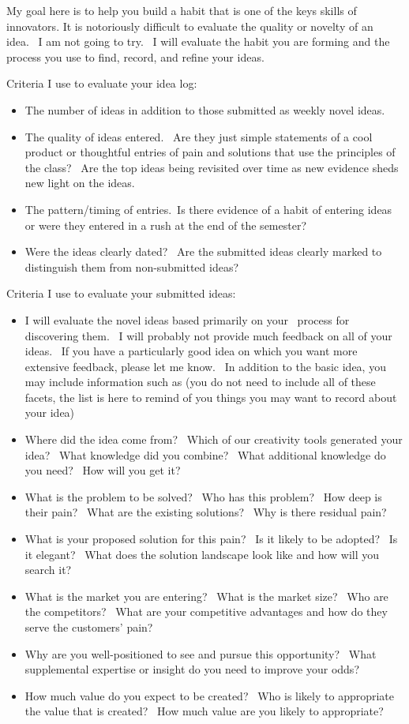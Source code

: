 \documentclass[11pt,article,oneside]{memoir}
\begin{document}
My goal here is to help you build a habit that is one of the keys skills
of innovators. It is notoriously difficult to evaluate the quality or
novelty of an idea.~ I am not going to try.~ I will evaluate the habit
you are forming and the process you use to find, record, and refine your
ideas.

Criteria I use to evaluate your idea log:

\begin{itemize}
\tightlist
\item
  The number of ideas in addition to those submitted as weekly novel
  ideas.
\item
  The quality of ideas entered.~ Are they just simple statements of a
  cool product or thoughtful entries of pain and solutions that use the
  principles of the class?~ Are the top ideas being revisited over time
  as new evidence sheds new light on the ideas.
\item
  The pattern/timing of entries.~Is there evidence of a habit of
  entering ideas or were they entered in a rush at the end of the
  semester?
\item
  Were the ideas clearly dated?~ Are the submitted ideas clearly marked
  to distinguish them from non-submitted ideas?
\end{itemize}

Criteria I use to evaluate your submitted ideas:

\begin{itemize}
\tightlist
\item
  I will evaluate the novel ideas based primarily on your~ process for
  discovering them.~ I will probably not provide much feedback on all of
  your ideas.~ If you have a particularly good idea on which you want
  more extensive feedback, please let me know.~ In addition to the basic
  idea, you may include information such as (you do not need to include
  all of these facets, the list is here to remind of you things you may
  want to record about your idea)
\item
  Where did the idea come from?~ Which of our creativity tools generated
  your idea?~ What knowledge did you combine?~ What additional knowledge
  do you need?~ How will you get it?
\item
  What is the problem to be solved?~ Who has this problem?~ How deep is
  their pain?~ What are the existing solutions?~ Why is there residual
  pain?
\item
  What is your proposed solution for this pain?~ Is it likely to be
  adopted?~ Is it elegant?~ What does the solution landscape look like
  and how will you search it?
\item
  What is the market you are entering?~ What is the market size?~ Who
  are the competitors?~ What are your competitive advantages and how do
  they serve the customers' pain?
\item
  Why are you well-positioned to see and pursue this opportunity?~ What
  supplemental expertise or insight do you need to improve your odds?
\item
  How much value do you expect to be created?~ Who is likely to
  appropriate the value that is created?~ How much value are you likely
  to appropriate?
\end{itemize}

\hypertarget{refs}{}
\end{document}
